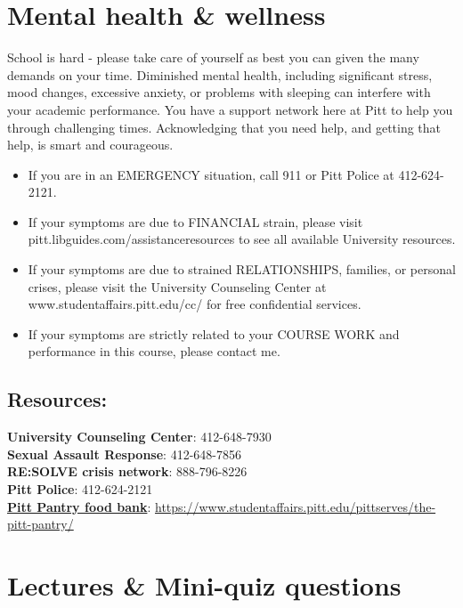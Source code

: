 \documentclass[
]{book}
\providecommand{\tightlist}{%
  \setlength{\itemsep}{0pt}\setlength{\parskip}{0pt}}
\begin{document}
\hypertarget{mental-health-wellness}{%
\chapter{Mental health \& wellness}\label{mental-health-wellness}}

School is hard - please take care of yourself as best you can given the many demands on your time. Diminished mental health, including significant stress, mood changes, excessive anxiety, or problems with sleeping can interfere with your academic performance. You have a support network here at Pitt to help you through challenging times. Acknowledging that you need help, and getting that help, is smart and courageous.

\begin{itemize}
\tightlist
\item
  If you are in an EMERGENCY situation, call 911 or Pitt Police at 412-624-2121.
\item
  If your symptoms are due to FINANCIAL strain, please visit pitt.libguides.com/assistanceresources to see all available University resources.
\item
  If your symptoms are due to strained RELATIONSHIPS, families, or personal crises, please visit the University Counseling Center at www.studentaffairs.pitt.edu/cc/ for free confidential services.
\item
  If your symptoms are strictly related to your COURSE WORK and performance in this course, please contact me.
\end{itemize}

\hypertarget{resources}{%
\section{Resources:}\label{resources}}

\textbf{University Counseling Center}: 412-648-7930\\
\textbf{Sexual Assault Response}: 412-648-7856\\
\textbf{RE:SOLVE crisis network}: 888-796-8226\\
\textbf{Pitt Police}: 412-624-2121\\
\href{https://www.studentaffairs.pitt.edu/pittserves/the-pitt-pantry/}{\textbf{Pitt Pantry food bank}}: \url{https://www.studentaffairs.pitt.edu/pittserves/the-pitt-pantry/}

\hypertarget{lectures-mini-quiz-questions}{%
\chapter{Lectures \& Mini-quiz questions}\label{lectures-mini-quiz-questions}}
\end{document}
